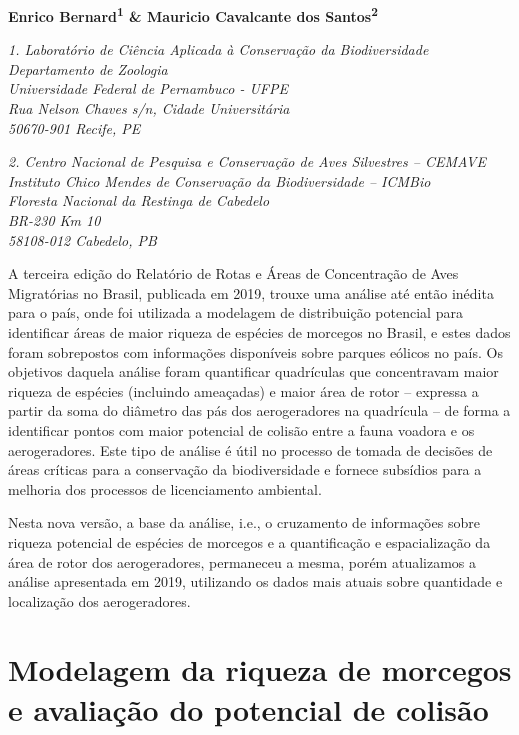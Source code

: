 \documentclass[
  oneside]{scrbook}
\begin{document}
\pagestyle{headings}

\textbf{Enrico Bernard\textsuperscript{1} \& Mauricio Cavalcante dos Santos\textsuperscript{2}}

\emph{1. Laboratório de Ciência Aplicada à Conservação da Biodiversidade}\\
\emph{Departamento de Zoologia}\\
\emph{Universidade Federal de Pernambuco - UFPE}\\
\emph{Rua Nelson Chaves s/n, Cidade Universitária}\\
\emph{50670-901 Recife, PE}

\emph{2. Centro Nacional de Pesquisa e Conservação de Aves Silvestres -- CEMAVE}\\
\emph{Instituto Chico Mendes de Conservação da Biodiversidade -- ICMBio}\\
\emph{Floresta Nacional da Restinga de Cabedelo}\\
\emph{BR-230 Km 10}\\
\emph{58108-012 Cabedelo, PB}

A terceira edição do Relatório de Rotas e Áreas de Concentração de Aves Migratórias no Brasil, publicada em 2019, trouxe uma análise até então inédita para o país, onde foi utilizada a modelagem de distribuição potencial para identificar áreas de maior riqueza de espécies de morcegos no Brasil, e estes dados foram sobrepostos com informações disponíveis sobre parques eólicos no país. Os objetivos daquela análise foram quantificar quadrículas que concentravam maior riqueza de espécies (incluindo ameaçadas) e maior área de rotor -- expressa a partir da soma do diâmetro das pás dos aerogeradores na quadrícula -- de forma a identificar pontos com maior potencial de colisão entre a fauna voadora e os aerogeradores. Este tipo de análise é útil no processo de tomada de decisões de áreas críticas para a conservação da biodiversidade e fornece subsídios para a melhoria dos processos de licenciamento ambiental.

Nesta nova versão, a base da análise, i.e., o cruzamento de informações sobre riqueza potencial de espécies de morcegos e a quantificação e espacialização da área de rotor dos aerogeradores, permaneceu a mesma, porém atualizamos a análise apresentada em 2019, utilizando os dados mais atuais sobre quantidade e localização dos aerogeradores.

\hypertarget{modelagem-da-riqueza-de-morcegos-e-avaliauxe7uxe3o-do-potencial-de-colisuxe3o}{%
\section{Modelagem da riqueza de morcegos e avaliação do potencial de colisão}\label{modelagem-da-riqueza-de-morcegos-e-avaliauxe7uxe3o-do-potencial-de-colisuxe3o}}
\end{document}
